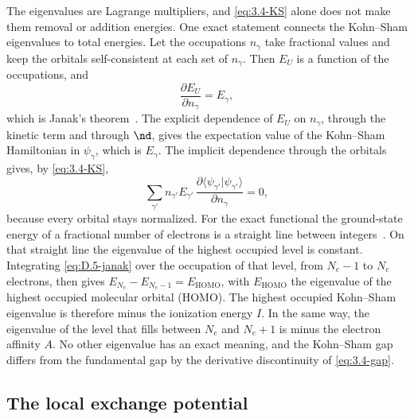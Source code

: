 The eigenvalues are Lagrange multipliers, and \cref{eq:3.4-KS} alone does not make them removal or addition energies. One exact statement connects the Kohn--Sham eigenvalues to total energies. Let the occupations $n_\gamma$ take fractional values and keep the orbitals self-consistent at each set of $n_\gamma$. Then $E_U$ is a function of the occupations, and
\begin{equation}
  \frac{\partial E_U}{\partial n_\gamma} = E_\gamma ,
  \label{eq:D.5-janak}
\end{equation}
which is Janak's theorem~\cite{janak1978proof}. The explicit dependence of $E_U$ on $n_\gamma$, through the kinetic term and through $\nd$, gives the expectation value of the Kohn--Sham Hamiltonian in $\psi_\gamma$, which is $E_\gamma$. The implicit dependence through the orbitals gives, by \cref{eq:3.4-KS},
\begin{equation*}
  \sum_{\gamma'}n_{\gamma'}E_{\gamma'}\,\frac{\partial\langle\psi_{\gamma'}|\psi_{\gamma'}\rangle}{\partial n_\gamma} = 0 ,
\end{equation*}
because every orbital stays normalized. For the exact functional the ground-state energy of a fractional number of electrons is a straight line between integers~\cite{perdew1982density}. On that straight line the eigenvalue of the highest occupied level is constant. Integrating \cref{eq:D.5-janak} over the occupation of that level, from $N_e - 1$ to $N_e$ electrons, then gives $E_{N_e} - E_{N_e-1} = E_{\mathrm{HOMO}}$, with $E_{\mathrm{HOMO}}$ the eigenvalue of the highest occupied molecular orbital (HOMO). The highest occupied Kohn--Sham eigenvalue is therefore minus the ionization energy $I$. In the same way, the eigenvalue of the level that fills between $N_e$ and $N_e + 1$ is minus the electron affinity $A$. No other eigenvalue has an exact meaning, and the Kohn--Sham gap differs from the fundamental gap by the derivative discontinuity of \cref{eq:3.4-gap}.

\subsection{The local exchange potential}

